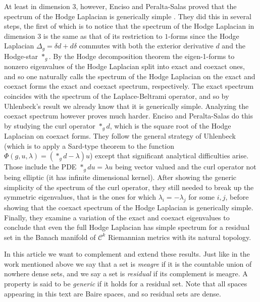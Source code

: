 At least in dimension $3$, however, Enciso and Peralta-Salas proved that the spectrum of the Hodge Laplacian is generically simple \cite{Enciso2012}. They did this in several steps, the first of which is to notice that the spectrum of the Hodge Laplacian in dimension $3$ is the same as that of its restriction to $1$-forms since the Hodge Laplacian $\Delta_g=\delta d+d\delta$ commutes with both the exterior derivative $d$ and the Hodge-star $\ast_g$. By the Hodge decomposition theorem \cite{Hodge1941} the eigen-1-forms to nonzero eigenvalues of the Hodge Laplacian split into exact and coexact ones, and so one naturally calls the spectrum of the Hodge Laplacian on the exact and coexact forms the exact and coexact spectrum, respectively. The exact spectrum coincides with the spectrum of the Laplace-Beltrami operator, and so by Uhlenbeck's result we already know that it is generically simple. Analyzing the coexact spectrum however proves much harder. Enciso and Peralta-Salas do this by studying the curl operator $\ast_g d$, which is the square root of the Hodge Laplacian on coexact forms. They follow the general strategy of Uhlenbeck (which is to apply a Sard-type theorem to the function $\Phi(g,u,\lambda)=(\ast_g d-\lambda)u$) except that significant analytical difficulties arise. Those include the PDE $\ast_g d u=\lambda u$ being vector valued and the curl operator not being elliptic (it has infinite dimensional kernel). After showing the generic simplicity of the spectrum of the curl operator, they still needed to break up the symmetric eigenvalues, that is the ones for which $\lambda_i=-\lambda_j$ for some $i,j$, before showing that the coexact spectrum of the Hodge Laplacian is generically simple. Finally, they examine a variation of the exact and coexact eigenvalues to conclude that even the full Hodge Laplacian has simple spectrum for a residual set in the Banach manifold of $\mathcal{C}^k$ Riemannian metrics with its natural topology.\par

In this article we want to complement and extend these results. Just like in the work mentioned above we say that a set is \textit{meagre} if it is the countable union of nowhere dense sets, and we say a set is \textit{residual} if its complement is meagre. A property is said to be \textit{generic} if it holds for a residual set. Note that all spaces appearing in this text are Baire spaces, and so residual sets are dense.


